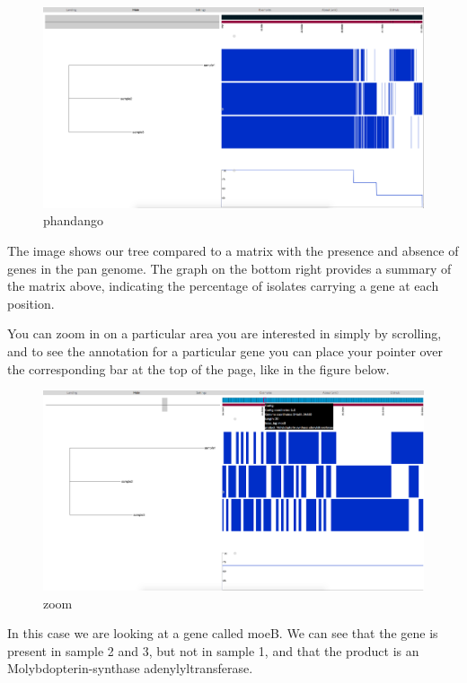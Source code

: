 \documentclass[11pt]{article}
\makeatletter
\def\maxwidth{\ifdim\Gin@nat@width>\linewidth\linewidth
    \else\Gin@nat@width\fi}
\let\Oldincludegraphics\includegraphics
\renewcommand{\includegraphics}[1]{\Oldincludegraphics[width=.8\maxwidth, height=.55\textheight, keepaspectratio]{#1}}
\makeatother
\begin{document}
\begin{figure}[!h]
\centering
\includegraphics{img/phandango.png}
\caption{phandango}
\end{figure}

    The image shows our tree compared to a matrix with the presence and
absence of genes in the pan genome. The graph on the bottom right
provides a summary of the matrix above, indicating the percentage of
isolates carrying a gene at each position.

You can zoom in on a particular area you are interested in simply by
scrolling, and to see the annotation for a particular gene you can place
your pointer over the corresponding bar at the top of the page, like in
the figure below.

\begin{figure}[H]
\centering
\includegraphics{img/phandango_zoom.png}
\caption{zoom}
\end{figure}

In this case we are looking at a gene called moeB. We can see that the
gene is present in sample 2 and 3, but not in sample 1, and that the
product is an Molybdopterin-synthase adenylyltransferase.
\end{document}
